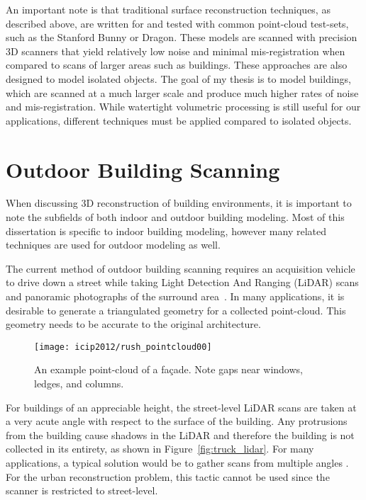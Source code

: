 \documentclass[12pt,onecolumn,oneside]{book}
\begin{document}
An important note is that traditional surface reconstruction techniques, as described above, are written for and tested with common point-cloud test-sets, such as the Stanford Bunny or Dragon.  These models are scanned with precision 3D scanners that yield relatively low noise and minimal mis-registration when compared to scans of larger areas such as buildings.  These approaches are also designed to model isolated objects.  The goal of my thesis is to model buildings, which are scanned at a much larger scale and produce much higher rates of noise and mis-registration.  While watertight volumetric processing is still useful for our applications, different techniques must be applied compared to isolated objects.

\section{Outdoor Building Scanning}
\label{sec:outdoor_scanning}

When discussing 3D reconstruction of building environments, it is important to note the subfields of both indoor and outdoor building modeling.  Most of this dissertation is specific to indoor building modeling, however many related techniques are used for outdoor modeling as well.

The current method of outdoor building scanning requires an acquisition vehicle to drive down a street while taking Light Detection And Ranging (LiDAR) scans and panoramic photographs of the surround area~\cite{Zakhor07,Chen07,Karimi00,Li97}.  In many applications, it is desirable to generate a triangulated geometry for a collected point-cloud.  This geometry needs to be accurate to the original architecture.  

\begin{figure}
	\begin{minipage}[b]{1.0\linewidth}
	  \centering
	  \centerline{\texttt{[image: icip2012/rush\_pointcloud00]}}
	\end{minipage}

	\caption[An example point-cloud of a fa\c{c}ade.]{An example point-cloud of a fa\c{c}ade. Note gaps near windows, ledges, and columns.}
	\label{fig:rush_points}
\end{figure}

For buildings of an appreciable height, the street-level LiDAR scans are taken at a very acute angle with respect to the surface of the building.  Any protrusions from the building cause shadows in the LiDAR and therefore the building is not collected in its entirety, as shown in Figure~\ref{fig:truck_lidar}.  For many applications, a typical solution would be to gather scans from multiple angles \cite{Tang10, Curless96}.  For the urban reconstruction problem, this tactic cannot be used since the scanner is restricted to street-level.
\end{document}
